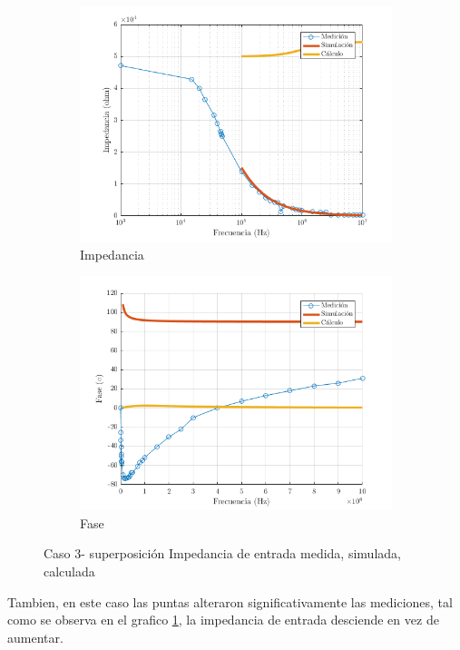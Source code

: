 \documentclass[../../main.tex]{subfiles}
\begin{document}
\begin{figure}[H]
\centering
\begin{subfigure}[http]{0.49\textwidth}
\includegraphics[width=\textwidth]{z_inv_r_c3}
\caption{Impedancia}\label{fig=zInvZc3}
\end{subfigure}
\begin{subfigure}[http]{0.49\textwidth}
\includegraphics[width=\textwidth]{z_inv_f_c3}
\caption{Fase} \label{fig=zInvFc3}
\end{subfigure}
\caption{Caso 3- superposición Impedancia de entrada  medida, simulada, calculada}
\end{figure}

Tambien, en este caso las puntas alteraron significativamente las mediciones, tal como se observa en el grafico \ref{fig=zInvZc3}, la impedancia de entrada desciende en vez de aumentar.
\end{document}
